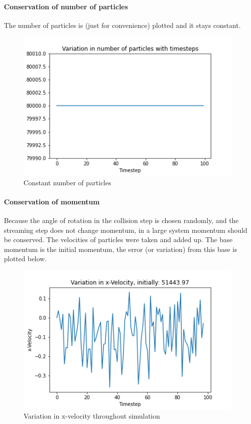 \documentclass[
]{article}
\begin{document}
\hypertarget{conservation-of-number-of-particles}{%
\paragraph{Conservation of number of
particles}\label{conservation-of-number-of-particles}}

The number of particles is (just for convenience) plotted and it stays
constant.

\begin{figure}
\centering
\includegraphics{Assets/number_particles.png}
\caption{Constant number of particles}
\end{figure}

\hypertarget{conservation-of-momentum}{%
\paragraph{Conservation of momentum}\label{conservation-of-momentum}}

Because the angle of rotation in the collision step is chosen randomly,
and the streaming step does not change momentum, in a large system
momentum should be conserved. The velocities of particles were taken and
added up. The base momentum is the initial momentum, the error (or
variation) from this base is plotted below.

\begin{figure}
\centering
\includegraphics{Assets/x_velocity_variation.png}
\caption{Variation in x-velocity throughout simulation}
\end{figure}
\end{document}
